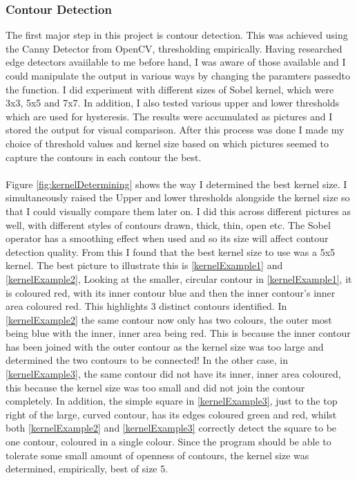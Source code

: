 \documentclass[11pt]{article}
\begin{document}
\subsubsection{Contour Detection}
The first major step in this project is contour detection. This was achieved
using the Canny Detector from OpenCV, thresholding empirically. Having
researched edge detectors avaiilable to me before hand, I was aware of those
available and I could manipulate the output in various ways by
changing the paramters passedto the function. I did experiment with different
sizes of Sobel kernel, which were 3x3, 5x5 and 7x7. In addition, I also
tested various upper and lower thresholds which are used for hysteresis. The
results were accumulated as pictures and I stored the output for visual
comparison. After this process was done I made my choice of threshold values
and kernel size based on which pictures seemed to capture the contours
in each contour the best. \\
\\
Figure \ref{fig:kernelDetermining} shows the way I determined the best kernel
size. I simultaneously raised the Upper and lower thresholds alongside the 
kernel size so that I could visually compare them later on. I did this
across different pictures as well, with different styles of contours drawn,
thick, thin, open etc. The Sobel operator has a smoothing effect when
used and so its size will affect contour detection quality.
From this I found that the best kernel size to use was
a 5x5 kernel. The best picture to illustrate this is \ref{kernelExample1} 
and \ref{kernelExample2}, Looking at the smaller, circular contour in
\ref{kernelExample1}, it is coloured red, with its inner contour
blue and then the inner contour's inner area coloured red. This highlights
3 distinct contours identified. In \ref{kernelExample2} the same contour
now only has two colours, the outer most being blue with the inner, inner
area being red. This is because the inner contour has been joined with the
outer contour as the kernel size was too large and determined the two
contours to be connected! In the other case, in \ref{kernelExample3}, the
same contour did not have its inner, inner area coloured, this  because the
kernel size was too small and did not join the contour completely. In 
addition, the simple square in \ref{kernelExample3}, just to the top right of
the large, curved contour, has its edges coloured green
and red, whilst both \ref{kernelExample2} and \ref{kernelExample3} correctly
detect the square to be one contour, coloured in a single colour. Since
the program should be able to tolerate some small amount of openness of
contours, the kernel size was determined, empirically, best of size 5.
\end{document}
